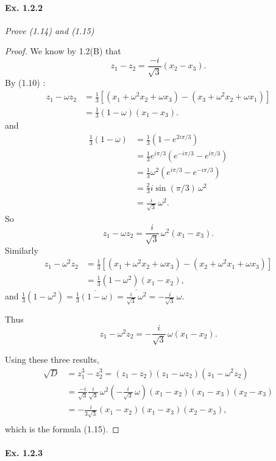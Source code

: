 \documentclass[11pt,a4paper]{article}
\begin{document}
\paragraph{Ex. 1.2.2}

{\it Prove (1.14) and (1.15)
}

\begin{proof}
We know by 1.2(B) that
$$z_1-z_2 = \frac{-i}{\sqrt{3}}(x_2-x_3).$$
By (1.10) :
\begin{align*}
z_1 - \omega z_2 &= \frac{1}{3}\left [ (x_1 + \omega^2 x_2+\omega x_3) - (x_3+\omega^2 x_2 + \omega x_1) \right]\\
&=\frac{1}{3}(1-\omega)(x_1-x_3).
\end{align*}
and
\begin{align*}
\frac{1}{3}(1-\omega) &= \frac{1}{3} \left(1 - e^{2i\pi/3} \right)\\
&= \frac{1}{3} e^{i\pi/3} \left( e^{-i\pi/3} - e^{i\pi/3}\right)\\
&= \frac{1}{3} \omega^2 \left( e^{i\pi/3} - e^{-i\pi/3}\right)\\
&=\frac{2}{3} i \sin (\pi/3) \, \omega^2\\
&= \frac{i}{\sqrt{3}}\,  \omega^2.
\end{align*}
So
$$z_1 - \omega z_2 = \frac{i}{\sqrt{3}}\,  \omega^2 (x_1-x_3).$$
Similarly 
\begin{align*}
z_1 - \omega^2 z_2 &= \frac{1}{3}\left [ (x_1 + \omega^2 x_2+\omega x_3) - (x_2+\omega^2 x_1 + \omega x_3) \right]\\
&=\frac{1}{3}(1-\omega^2)(x_1-x_2),
\end{align*}
and  $\frac{1}{3}(1-\omega^2) = \overline{\frac{1}{3}(1-\omega) } = \overline{\frac{i}{\sqrt{3}}\,  \omega^2} =-\frac{i}{\sqrt{3}}\,  \omega.$

Thus
$$z_1 - \omega^2 z_2 = -\frac{i}{\sqrt{3}}\,  \omega (x_1-x_2).$$

Using these three results,
\begin{align*}
\sqrt{D} &= z_1^3 - z_2^3 = (z_1-z_2)(z_1-\omega z_2)(z_1-\omega^2 z_2)\\
&=\frac{-i}{\sqrt{3}}  \frac{i}{\sqrt{3}}\,  \omega^2 \left( -\frac{i}{\sqrt{3}}\,  \omega\right) (x_1-x_2)(x_1-x_3)(x_2-x_3)\\
&=-\frac{i}{3\sqrt{3}} (x_1-x_2)(x_1-x_3)(x_2-x_3),\\
\end{align*}
which is the formula (1.15).
\end{proof}

\paragraph{Ex. 1.2.3}
\end{document}
